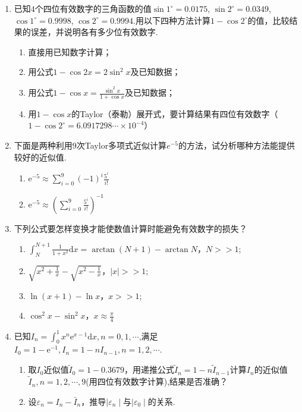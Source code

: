 \documentclass[a4paper]{article}
\begin{document}
\courseheader
{}

\begin{enumerate}
  \setlength{\itemsep}{3\parskip}

  \item 已知$4$个四位有效数字的三角函数的值$\sin 1^\circ =0.0175$, $\sin 2^\circ =0.0349$, $\cos 1 ^ \circ = 0.9998$, $\cos 2 ^\circ = 0.9994$.用以下四种方法计算$1 - \cos 2 ^ \circ$的值，比较结果的误差，并说明各有多少位有效数字.
  \begin{enumerate}[label=（\arabic*）]
    \item 直接用已知数字计算；
    \item 用公式$1-\cos 2x = 2 \sin^2 x$及已知数据；
    \item 用公式$1-\cos x = \frac{\sin^2 x}{1+\cos x}$及已知数据；
    \item 用$1-\cos x$的Taylor（泰勒）展开式，要计算结果有四位有效数字（$1-\cos 2^\circ =6.0917298\cdots \times 10^{-4}$）
  \end{enumerate}
  \begin{solution}

  \end{solution}

  \item 下面是两种利用$9$次Taylor多项式近似计算$e^{-5}$的方法，试分析哪种方法能提供较好的近似值.
  \begin{enumerate}[label=（\arabic*）]
    \item $\mathrm{e}^{-5}\approx\sum_{i=0}^9\left(-1\right)^i\frac{5^i}{i!}$
    \item $\mathrm{e}^{-5}\approx\left(\sum_{i=0}^9\frac{5^i}{i!}\right)^{-1}$
  \end{enumerate}

  \item 下列公式要怎样变换才能使数值计算时能避免有效数字的损失？
  \begin{enumerate}[label=（\arabic*）]
    \item $\int_N^{N+1}\frac{1}{1+x^2}\mathrm{d}x=\arctan(N+1)-\arctan N$，$N>>1$;
    \item $\sqrt{x^2+\frac{1}{x}}-\sqrt{x^2-\frac{1}{x}}$，$|x|>>1$;
    \item $\ln(x+1)-\ln x$，$x>>1$;
    \item $\cos^2x-\sin^2x$，$x\approx\frac{\pi}{4}$
  \end{enumerate}

  \item 已知$I_n=\int_0^1x^n\mathrm{e}^{x-1}\mathrm{d}x,n=0,1,\cdots$,满足$I_0=1-\mathrm{e}^{-1},I_n=1-nI_{n-1},n=1,2,\cdots$.
  \begin{enumerate}[label=（\arabic*）]
    \item 取$I_0$近似值$\tilde{I}_{0}=1-0.3679$，用递推公式$\tilde{I}_{n}=1-n\tilde{I}_{n-1}$计算$I_n$的近似值$\tilde{I}_n,n=1,2,\cdots ,9$(用四位有效数字计算),结果是否准确？
    \item 设$\varepsilon_n=I_n-\bar{I}_n$，推导$\mid\varepsilon_n\mid$与$\mid\varepsilon_0\mid$的关系.
  \end{enumerate}

\end{enumerate}
\end{document}
